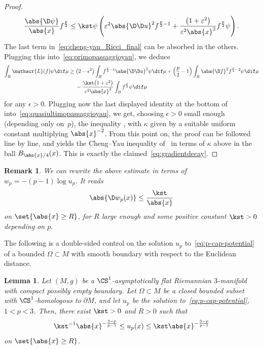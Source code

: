 \documentclass[10pt,a4paper]{amsart}
\numberwithin{equation}{section}
\newtheorem{Lemma}[Theorem]{Lemma}
\newtheorem{Remark}[Theorem]{Remark} }
\begin{document}
\begin{proof}
\[
\frac{\abs{\D \psi}}{\abs{x}} f^{\frac{p}{2}} \leq \kst \psi\left(\varepsilon^2 \abs{\D \D u}^2 f^{\frac{p}{2} - 1}+ \frac{\big(1+\varepsilon^2\big)}{\varepsilon^2\abs{x}^2} f^{\frac{p}{2}} \psi\right).
\]
The last term in~\eqref{eq:cheng-yau_Ricci_final} can be absorbed in the others. Plugging this into~\eqref{eq:primopassaggioyau}, we deduce
\begin{align}
\int_{B} \mathscr{L} (f) \psi \dif\mu \geq{}& \big(2 - \epsilon^2\big)\int_{B}f^{\frac{p}{2} - 1} \abs{\D\D u}^2 \psi \dif\mu + \left(\frac{p}{2} -1\right)\int_{B}\abs{\D f}^2 f^{\frac{p}{2} - 2} \psi \dif \mu \nonumber\\
&{}- \frac{\kst\big(1+\varepsilon^2\big)}{\varepsilon^2\abs{x}^2} \int_{B}f^{\frac{p}{2}}\psi \dif\mu \label{eq:quasiultimopassaggioyau}
\end{align}
for any $\epsilon > 0$. Plugging now the last displayed identity at the bottom of~\cite[p. 763]{wang_localgradientestimateharmonic_2010} into~\eqref{eq:quasiultimopassaggioyau}, we get, choosing $\epsilon > 0$ small enough (depending only on~$p$), the inequality \cite[formula~(2.3)]{wang_localgradientestimateharmonic_2010}, with $\kappa$ given by a suitable uniform constant multiplying $\abs{x}^{-2}$. From this point on, the proof can be followed line by line, and yields the Cheng--Yau inequality of~\cite[Theorem~1.1]{wang_localgradientestimateharmonic_2010} in terms of $\kappa$ above in the ball $B_{\abs{x}/4}(x)$. This is exactly the claimed~\eqref{eq:gradientdecay}. \end{proof}

\begin{Remark}\label{rmk:chengwp}
We can rewrite the above estimate in terms of $w_p = -(p-1)\log u_p$. It reads
\[
\abs{\D w_p(x)} \leq \frac{ \kst}{\abs{x}}
\]
on $\set{\abs{x} \geq R}$, for $R$ large enough and some positive constant $\kst>0$ depending on $p$.
\end{Remark}
The following is a double-sided control on the solution $u_p$ to~\eqref{eq:p-cap-potential} of a bounded $\Omega \subset M$ with smooth boundary with respect to the Euclidean distance.

\begin{Lemma}\label{prop:menga_nomore}
 Let $(M, g)$ be a $\CS^1$-asymptotically flat Riemannian $3$-manifold with compact possibly empty boundary. Let $\Omega \subset M$ be a closed bounded subset with $\CS^1$-homologous to $\partial M$, and let $u_p$ be the solution to~\eqref{eq:p-cap-potential}, $1< p < 3$. Then, there exist $\kst >0$ and $R>0$ such that
 \[
 \kst^{-1}\abs{x}^{-\frac{3-p}{p-1}} \leq u_p(x) \leq \kst\abs{x}^{-\frac{3-p}{p-1}}
 \]
on $\set{\abs{x} \geq R}$.
\end{Lemma}
\end{document}
